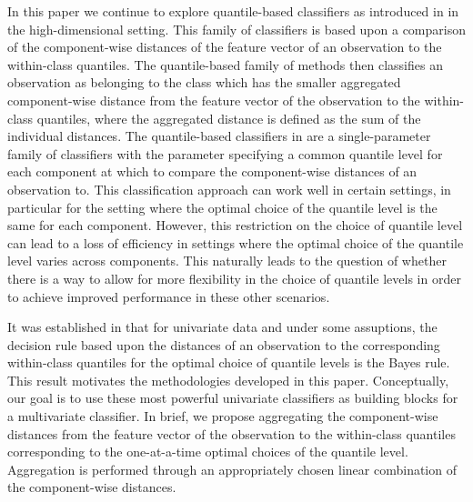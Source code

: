 In this paper we continue to explore quantile-based classifiers as introduced in
\cite{hennig2016} in the high-dimensional setting.  This family of classifiers
is based upon a comparison of the component-wise distances of the feature vector
of an observation to the within-class quantiles.  The quantile-based family of
methods then classifies an observation as belonging to the class which has the
smaller aggregated component-wise distance from the feature vector of the
observation to the within-class quantiles, where the aggregated distance is
defined as the sum of the individual distances.  The quantile-based classifiers
in \cite{hennig2016} are a single-parameter family of classifiers with the
parameter specifying a common quantile level for each component at which to
compare the component-wise distances of an observation to.  This classification
approach can work well in certain settings, in particular for the setting where
the optimal choice of the quantile level is the same for each component.
However, this restriction on the choice of quantile level can lead to a loss of
efficiency in settings where the optimal choice of the quantile level varies
across components.  This naturally leads to the question of whether there is a
way to allow for more flexibility in the choice of quantile levels in order to
achieve improved performance in these other scenarios.

It was established in \cite{hennig2016} that for univariate data and under some
assuptions, the decision rule based upon the distances of an observation to the
corresponding within-class quantiles for the optimal choice of quantile levels
is the Bayes rule.  This result motivates the methodologies developed in this
paper.  Conceptually, our goal is to use these most powerful univariate
classifiers as building blocks for a multivariate classifier.  In brief, we
propose aggregating the component-wise distances from the feature vector of the
observation to the within-class quantiles corresponding to the one-at-a-time
optimal choices of the quantile level.  Aggregation is performed through an
appropriately chosen linear combination of the component-wise distances.


